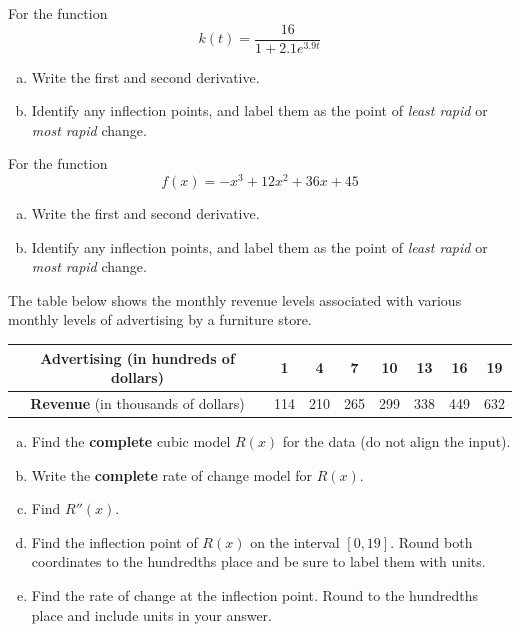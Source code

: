 \documentclass[notes]{subfiles}
\begin{document}
		\begin{ex} For the function
			\[k(t) =  \frac{16}{1+2.1e^{3.9t}}\]
			\begin{enumerate}[(a)]
				\item Write the first and second derivative.
					
				\item Identify any inflection points, and label them as the point of \emph{least rapid} or \emph{most rapid} change.
					
			\end{enumerate}
		\end{ex}
		
		\begin{ex} For the function
			\[f(x) = -x^3+12x^2 + 36x + 45\]
			\begin{enumerate}[(a)]
				\item Write the first and second derivative.
					
				\item Identify any inflection points, and label them as the point of \emph{least rapid} or \emph{most rapid} change.
					
			\end{enumerate}
		\end{ex}
			\newpage
			
		\begin{ex} 
			The table below shows the monthly revenue levels associated with various monthly levels of advertising by a furniture store.
				\begin{center}
					{\renewcommand{\arraystretch}{1.2}
					\begin{tabular}{|c|c|c|c|c|c|c|c|}\hline
					\textbf{Advertising} (in hundreds of dollars) & 1 & 4 & 7 & 10 & 13 & 16 & 19\\ \hline
					\textbf{Revenue} (in thousands of dollars) & 114 & 210 & 265 & 299 & 338 & 449 & 632\\ \hline
					\end{tabular}
					}
				\end{center}
			\begin{enumerate}[(a)]
				\item Find the \textbf{complete} cubic model $R(x)$ for the data (do not align the input).
					
				\item Write the \textbf{complete} rate of change model for $R(x)$.
					
				\item Find $R''(x)$.
					
				\item Find the inflection point of $R(x)$ on the interval $[0,19]$.  Round both coordinates to the hundredths place and be sure to label them with units.
					
				\item Find the rate of change at the inflection point.  Round to the hundredths place and include units in your answer.
					
			\end{enumerate}
		\end{ex}
			\newpage
			
\end{document}
